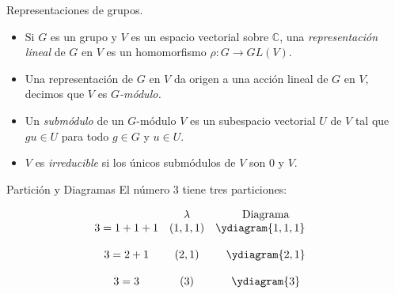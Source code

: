 \documentclass[final,xcolor=svgnames]{beamer}
\begin{document}
\begin{frame}{}
\begin{columns}
\begin{column}{0.5\textwidth}
      \begin{block}{Representaciones de grupos.}
        \begin{itemize}
          \item Si $G$ es un grupo y $V$ es un espacio vectorial sobre
            $\mathbb{C}$, una \textit{representación lineal} de $G$ en
            $V$ es un homomorfismo $\rho:G\rightarrow GL(V).$
          \item Una representación de $G$ en $V$ da origen a una
            acción lineal de $G$ en $V$, decimos que $V$ es \emph{$G$-módulo.}  
         \item Un \emph{submódulo} de un $G$-módulo $V$ es un
           subespacio vectorial $U$ de $V$ tal que $gu \in U$ para todo $g\in G$ y $u\in U$.
          \item $V$ es \emph{irreducible} si los únicos submódulos de
            $V$ son $0$ y $V$.
        \end{itemize}
      \end{block}

      \begin{block}{Partición y Diagramas}
        El número $3$ tiene tres particiones:
        \begin{center}
          \begin{equation*}
            \begin{array}{cccc}
                        & \lambda  &\mbox{Diagrama} \\ %
              3=1+1+1   &  (1,1,1) & \ydiagram{1,1,1} \quad\\ %
             \\ 3=2+1   &   (2,1)  &\ydiagram{2,1} \\ %
             \\ 3=3     &   (3)    &\ydiagram{3} %
            \end{array}
          \end{equation*}
        \end{center}
      \end{block}
     

\end{column}
\end{columns}
\end{frame}
\end{document}
